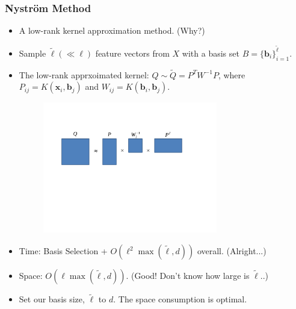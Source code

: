 \documentclass{beamer}
\def\bb{{\boldsymbol b}}
\def\bb{{\boldsymbol b}}
\def\bx{{\boldsymbol x}}
\begin{document}
\begin{frame}
  \frametitle{Nystr\"om Method}
  \begin{itemize}
    \item A low-rank kernel approximation method. (Why?)
    \pause
    \item Sample $\tilde{\ell} (\ll \ell)$ feature vectors from $X$ with a basis set $B = \{\bb_i\}_{i = 1}^{\tilde{\ell}}$.
    \item [] The low-rank apprxoimated kernel: $Q \sim \tilde{Q} = P^TW^{-1}P$, 
    where $P_{ij} = K(\bx_i, \bb_j)$ and $W_{ij} = K(\bb_i, \bb_j)$.
\begin{figure}
  \includegraphics[width=3in]{nystrom.pdf}\\
\end{figure}


    \pause
    \item Time: Basis Selection + $O(\ell^2 \max(\tilde{\ell}, d))$ overall. (Alright...)
    \item [] Space: $O(\ell \max(\tilde{\ell}, d))$. (Good! Don't know how large is $\tilde{\ell}$..)
    \pause
    \item Set our basis size, $\tilde{\ell}$ to $d$. The space consumption is optimal.
  \end{itemize}
\end{frame}
\end{document}
